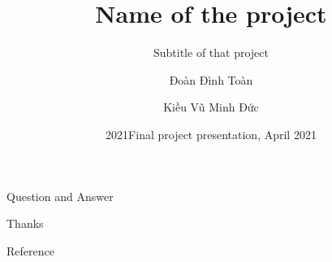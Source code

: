 \documentclass{beamer}
\date{2021}
\title[Intro2DS] %
{Name of the project}
\subtitle{Subtitle of that project}
\author[Đình Toàn, Minh Đức] %
{Đoàn Đình Toàn\inst{1} \and Kiều Vũ Minh Đức\inst{1}}
\institute[FIT-HCMUS] %
{
    \inst{1}%
    Faculty of Information Technology\\
    University Of Science

}
\date[\today] %
{Final project presentation, April 2021}
\begin{document}
\frame{\titlepage}

% 


\begin{frame}
    \huge{\centerline{Question and Answer}}
\end{frame}

\begin{frame}
    \huge{\centerline{Thanks}}
\end{frame}

\begin{frame}{Reference}

    \cite{pham_2021}
    \printbibliography



\end{frame}
\end{document}
